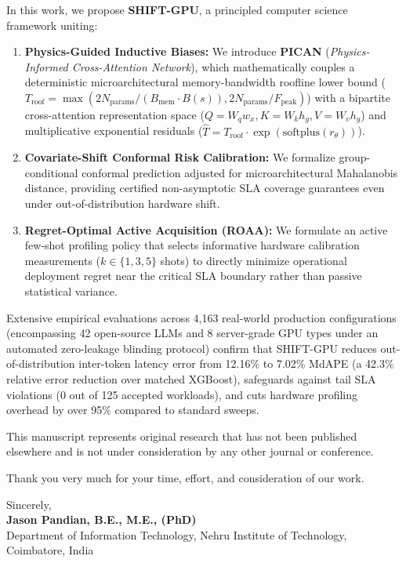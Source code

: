\documentclass[11pt]{article}
\begin{document}
In this work, we propose \textbf{SHIFT-GPU}, a principled computer science framework uniting:
\begin{enumerate}
    \item \textbf{Physics-Guided Inductive Biases:} We introduce \textbf{PICAN} (\textit{Physics-Informed Cross-Attention Network}), which mathematically couples a deterministic microarchitectural memory-bandwidth roofline lower bound ($T_{\text{roof}} = \max(2 N_{\text{params}} / (B_{\text{mem}} \cdot B(s)), 2 N_{\text{params}} / F_{\text{peak}})$) with a bipartite cross-attention representation space ($Q = W_q w_x, K = W_k h_g, V = W_v h_g$) and multiplicative exponential residuals ($\hat{T} = T_{\text{roof}} \cdot \exp(\text{softplus}(r_\theta))$).
    \item \textbf{Covariate-Shift Conformal Risk Calibration:} We formalize group-conditional conformal prediction adjusted for microarchitectural Mahalanobis distance, providing certified non-asymptotic SLA coverage guarantees even under out-of-distribution hardware shift.
    \item \textbf{Regret-Optimal Active Acquisition (ROAA):} We formulate an active few-shot profiling policy that selects informative hardware calibration measurements ($k \in \{1, 3, 5\}$ shots) to directly minimize operational deployment regret near the critical SLA boundary rather than passive statistical variance.
\end{enumerate}

Extensive empirical evaluations across 4,163 real-world production configurations (encompassing 42 open-source LLMs and 8 server-grade GPU types under an automated zero-leakage blinding protocol) confirm that SHIFT-GPU reduces out-of-distribution inter-token latency error from 12.16\% to 7.02\% MdAPE (a 42.3\% relative error reduction over matched XGBoost), safeguards against tail SLA violations (0 out of 125 accepted workloads), and cuts hardware profiling overhead by over 95\% compared to standard sweeps.

This manuscript represents original research that has not been published elsewhere and is not under consideration by any other journal or conference.

Thank you very much for your time, effort, and consideration of our work.

\vspace{1.5em}
\noindent
Sincerely,\\[1em]
\textbf{Jason Pandian, B.E., M.E., (PhD)}\\
Department of Information Technology, Nehru Institute of Technology, Coimbatore, India
\end{document}
